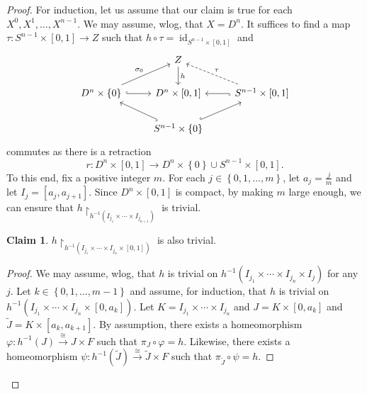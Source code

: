 \documentclass[10pt,letterpaper,cm]{nupset}
\theoremstyle{definition}
\theoremstyle{theorem}
\newtheorem*{claim}{Claim}
\theoremstyle{remark}
\newcommand{\1}{\mathbb{1}}
\newcommand{\0}{\vec 0}
\DeclareMathOperator{\id}{id}
\begin{document}
\begin{proof}
For induction, let us assume that our claim is true for each $X^0, X^1, \ldots, X^{n-1}$. We may assume, wlog, that $X = D^n$. It suffices to find a map $\tau : S^{n-1} \times \left[0,1\right] \to Z$ such that $h \circ \tau = \id_{S^{n-1}\times \left[0,1\right]}$ and
\[
\begin{tikzcd}
                                                        & Z \arrow[d, "h"]                                       &                                                           \\
D^n \times \left\{0\right\} \arrow[r, hook] \arrow[ru, "\sigma_0"] & {D^n \times \left[0,1\right]}                                     & {S^{n-1}\times \left[0,1\right]} \arrow[l, hook] \arrow[lu, "\tau"', dashed] \\
                                                        & S^{n-1} \times \left\{0\right\} \arrow[lu, hook] \arrow[ru, hook] &                                                          
\end{tikzcd}
\] commutes as there is a retraction $$r: D^n \times \left[0,1\right] \to D^{n} \times \left\{0\right\} \cup S^{n-1}\times \left[0,1\right].$$ To this end, fix a positive integer $m$. For each $j\in \left\{0,1, \ldots, m\right\}$, let $a_j = \frac{j}{m}$ and let $I_j = \left[a_j, a_{j+1}\right]$. Since $D^n \times \left[0,1\right]$ is compact,  by making $m$ large enough, we can ensure that $h\restriction_{h^{-1}(I_{j_1} \times \cdots \times I_{j_{n+1}})}$ is trivial.
\begin{claim}
$h\restriction_{h^{-1}(I_{j_1} \times \cdots \times I_{j_n} \times  \left[0,1\right])}$ is also trivial. 
\end{claim}
\begin{proof}
We may assume, wlog, that $h$ is trivial on $h^{-1}(I_{j_1} \times \cdots \times I_{j_n} \times  I_j)$ for any $j$. Let $k\in \left\{0, 1, \ldots, m-1\right\}$ and assume, for induction, that $h$ is trivial on $h^{-1}(I_{j_1} \times \cdots \times I_{j_n} \times  \left[0,a_k\right])$. Let $K = I_{j_1} \times \cdots \times I_{j_n}$ and $J = K\times \left[0, a_k\right]$ and $\tilde{J}= K\times \left[a_k, a_{k+1}\right]$. By assumption, there exists a homeomorphism $\varphi :h^{-1}(J) \overset{\cong}{\longrightarrow} J\times F$ such that $\pi_J \circ \varphi =h$. Likewise, there exists a homeomorphism $\psi : h^{-1}(\tilde{J}) \overset{\cong}{\longrightarrow} \tilde{J} \times F$ such that $\pi_{\tilde{J}} \circ \psi = h$.

\smallskip


\end{proof}
\end{proof}
\end{document}
